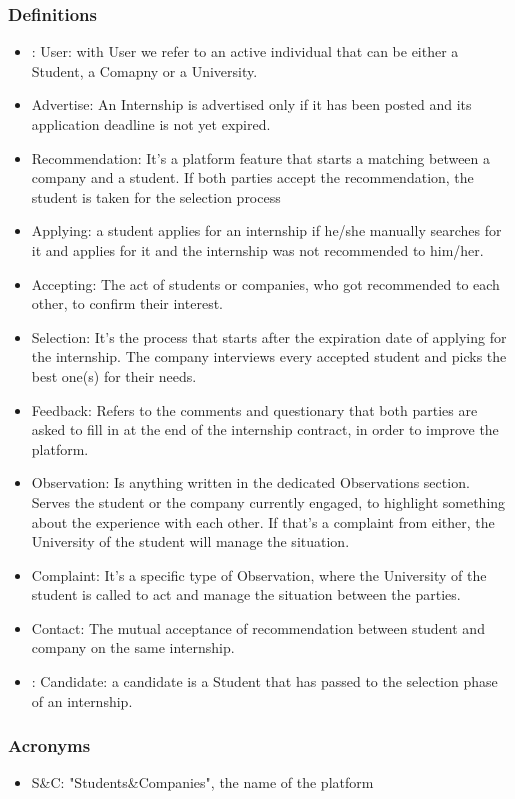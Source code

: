 \documentclass{article}
\begin{document}
\subsubsection{Definitions}
    \begin{itemize}
        \item: User: with User we refer to an active individual that can be either a Student, a Comapny or a University.
        \item Advertise: An Internship is advertised only if it has been posted and its application deadline is not yet expired.
        \item Recommendation: It's a platform feature that starts a matching between a company and a student. If both parties accept the recommendation, the student is taken for the selection process
        \item Applying: a student applies for an internship if he/she manually searches for it and applies for it and the internship was not recommended to him/her.
        \item Accepting: The act of students or companies, who got recommended to each other, to confirm their interest. 
        \item Selection: It's the process that starts after the expiration date of applying for the internship. The company interviews every accepted student and picks the best one(s) for their needs. 
        \item Feedback: Refers to the comments and questionary that both parties are asked to fill in at the end of the internship contract, in order to improve the platform.
        \item Observation: Is anything written in the dedicated Observations section. Serves the student or the company currently engaged, to highlight something about the experience with each other. If that's a complaint from either, the University of the student will manage the situation.
        \item Complaint: It's a specific type of Observation, where the University of the student is called to act and manage the situation between the parties.
        \item Contact: The mutual acceptance of recommendation between student and company on the same internship.
        \item: Candidate: a candidate is a Student that has passed to the selection phase of an internship.
    \end{itemize}
\subsubsection{Acronyms}
    \begin{itemize}
        \item S\&C: "Students\&Companies", the name of the platform
    \end{itemize}
\end{document}
